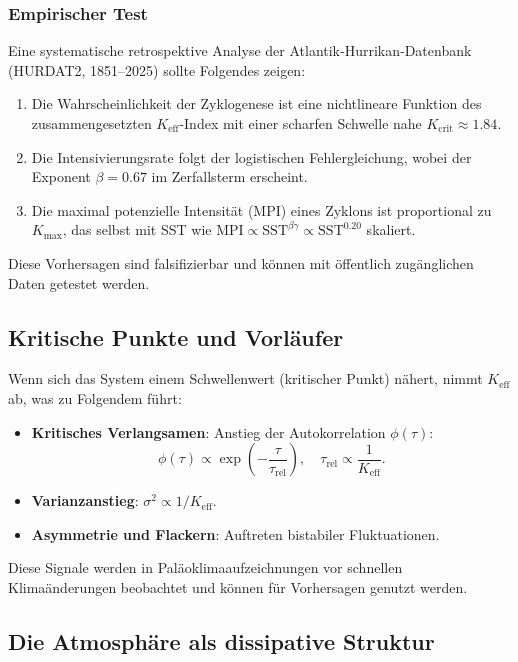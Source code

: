\documentclass[12pt,a4paper]{article}
\newcommand{\Keff}{K_{\mathrm{eff}}}
\begin{document}
	\subsubsection*{Empirischer Test}
	
	Eine systematische retrospektive Analyse der Atlantik‑Hurrikan‑Datenbank (HURDAT2, 1851–2025) sollte Folgendes zeigen:
	\begin{enumerate}
		\item Die Wahrscheinlichkeit der Zyklogenese ist eine nichtlineare Funktion des zusammengesetzten \(\Keff\)-Index mit einer scharfen Schwelle nahe \(K_{\mathrm{crit}} \approx 1.84\).
		\item Die Intensivierungsrate folgt der logistischen Fehlergleichung, wobei der Exponent \(\beta = 0.67\) im Zerfallsterm erscheint.
		\item Die maximal potenzielle Intensität (MPI) eines Zyklons ist proportional zu \(K_{\mathrm{max}}\), das selbst mit SST wie \(\mathrm{MPI} \propto \mathrm{SST}^{\beta\gamma} \propto \mathrm{SST}^{0.20}\) skaliert.
	\end{enumerate}
	Diese Vorhersagen sind falsifizierbar und können mit öffentlich zugänglichen Daten getestet werden.
	
	\subsection{Kritische Punkte und Vorläufer}
	
	Wenn sich das System einem Schwellenwert (kritischer Punkt) nähert, nimmt \(\Keff\) ab, was zu Folgendem führt:
	\begin{itemize}
		\item \textbf{Kritisches Verlangsamen}: Anstieg der Autokorrelation \(\phi(\tau)\):
		\[
		\phi(\tau) \propto \exp\!\left(-\frac{\tau}{\tau_{\text{rel}}}\right),\quad \tau_{\text{rel}} \propto \frac{1}{\Keff}.
		\]
		\item \textbf{Varianzanstieg}: \(\sigma^2 \propto 1/\Keff\).
		\item \textbf{Asymmetrie und Flackern}: Auftreten bistabiler Fluktuationen.
	\end{itemize}
	Diese Signale werden in Paläoklimaaufzeichnungen vor schnellen Klimaänderungen beobachtet und können für Vorhersagen genutzt werden.
	
	\subsection{Die Atmosphäre als dissipative Struktur}
	\label{subsec:atmo_diss}
	
\end{document}
